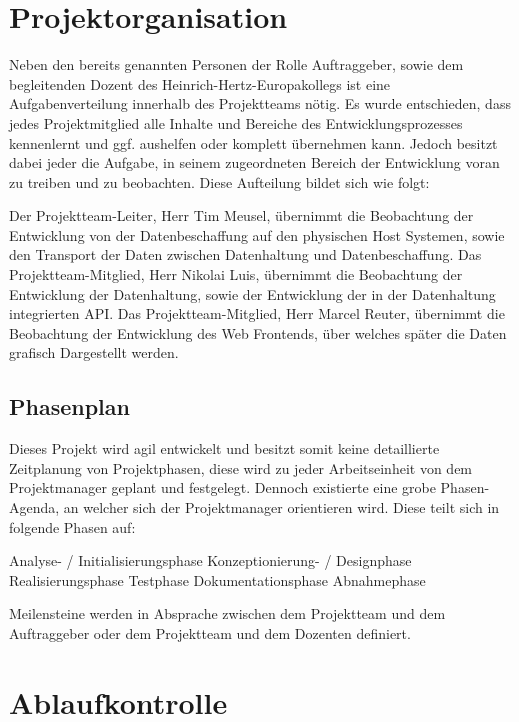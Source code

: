 \section{Projektorganisation}

Neben den bereits genannten Personen der Rolle Auftraggeber, sowie dem
begleitenden Dozent des Heinrich-Hertz-Europakollegs ist eine
Aufgabenverteilung innerhalb des Projektteams nötig. Es wurde entschieden, dass
jedes Projektmitglied alle Inhalte und Bereiche des Entwicklungsprozesses
kennenlernt und ggf. aushelfen oder komplett übernehmen kann. Jedoch besitzt
dabei jeder die Aufgabe, in seinem zugeordneten Bereich der Entwicklung voran
zu treiben und zu beobachten. Diese Aufteilung bildet sich wie folgt:
\begin{outline}
  \1 Der Projektteam-Leiter, Herr Tim Meusel, übernimmt die Beobachtung der
    \2 Entwicklung von der Datenbeschaffung auf den physischen Host Systemen,
    \2 sowie den Transport der Daten zwischen Datenhaltung und Datenbeschaffung.
  \1 Das Projektteam-Mitglied, Herr Nikolai Luis, übernimmt die Beobachtung der
    \2 Entwicklung der Datenhaltung,
    \2 sowie der Entwicklung der in der Datenhaltung integrierten API.
  \1 Das Projektteam-Mitglied, Herr Marcel Reuter, übernimmt die Beobachtung der
    \2 Entwicklung des Web Frontends, über welches später die Daten grafisch
    Dargestellt werden.
\end{outline}

\subsection{Phasenplan}

Dieses Projekt wird agil entwickelt und besitzt somit keine detaillierte
Zeitplanung von Projektphasen, diese wird zu jeder Arbeitseinheit von dem
Projektmanager geplant und festgelegt. Dennoch existierte eine grobe
Phasen-Agenda, an welcher sich der Projektmanager orientieren wird. Diese
teilt sich in folgende Phasen auf:
\begin{outline}
  \1 Analyse- / Initialisierungsphase
  \1 Konzeptionierung- / Designphase
  \1 Realisierungsphase
  \1 Testphase
  \1 Dokumentationsphase
  \1 Abnahmephase
\end{outline}

Meilensteine werden in Absprache zwischen dem Projektteam und dem Auftraggeber
oder dem Projektteam und dem Dozenten definiert.

\section{Ablaufkontrolle}

